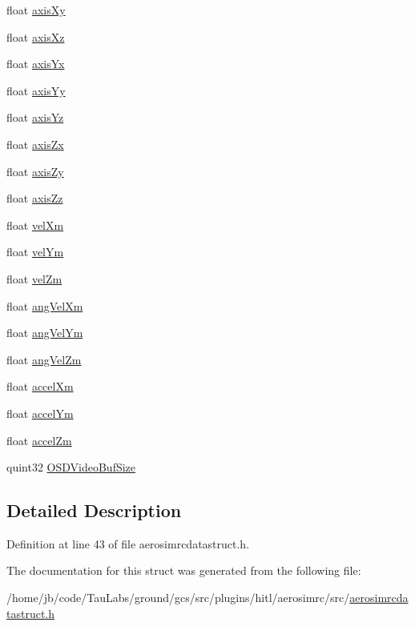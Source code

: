 \begin{DoxyCompactItemize}
\item 
float \hyperlink{group___aero_sim_r_c_gaf149495ae6cb0a4b55f124b645e0cc8d}{axis\-Xy}
\item 
float \hyperlink{group___aero_sim_r_c_gaf6a11ab25129a46c7195678d223f8cba}{axis\-Xz}
\item 
float \hyperlink{group___aero_sim_r_c_gab46b6cb491df61bb0808c6a2942f5f26}{axis\-Yx}
\item 
float \hyperlink{group___aero_sim_r_c_gab1c3f18d56d396a6dd95411539ffc0e8}{axis\-Yy}
\item 
float \hyperlink{group___aero_sim_r_c_ga7c0f6efcd45a801369e92067bc85a5ca}{axis\-Yz}
\item 
float \hyperlink{group___aero_sim_r_c_gac74b099d24d55ff1692b855313489324}{axis\-Zx}
\item 
float \hyperlink{group___aero_sim_r_c_ga28db280f796bbada439e147a61037c0f}{axis\-Zy}
\item 
float \hyperlink{group___aero_sim_r_c_ga62dda20d79d63155064a31a27d06e930}{axis\-Zz}
\item 
float \hyperlink{group___aero_sim_r_c_ga5b8ca52e6b6fcba33660c4164ff14b21}{vel\-Xm}
\item 
float \hyperlink{group___aero_sim_r_c_ga78ba6a4d5b2134bed1c2396ff9212df0}{vel\-Ym}
\item 
float \hyperlink{group___aero_sim_r_c_ga35865106b3179109ebbec06aed189fad}{vel\-Zm}
\item 
float \hyperlink{group___aero_sim_r_c_gac5161f5332b6bc49ca097e2c27be8a22}{ang\-Vel\-Xm}
\item 
float \hyperlink{group___aero_sim_r_c_ga1cdf55eb78da8c312e32d9d5be75afef}{ang\-Vel\-Ym}
\item 
float \hyperlink{group___aero_sim_r_c_ga4387cb264fd400cd98815e6145b8114c}{ang\-Vel\-Zm}
\item 
float \hyperlink{group___aero_sim_r_c_ga8e87f9c4846725309216b66cf48a4fdd}{accel\-Xm}
\item 
float \hyperlink{group___aero_sim_r_c_gafb442cc82353fedd9b1a4b1f841a780a}{accel\-Ym}
\item 
float \hyperlink{group___aero_sim_r_c_ga15b5242cd24b1253d8fa5a12d07e3b76}{accel\-Zm}
\item 
quint32 \hyperlink{group___aero_sim_r_c_ga9c59c8c051c445f8f8b17ed8b42a2820}{\-O\-S\-D\-Video\-Buf\-Size}
\end{DoxyCompactItemize}


\subsection{\-Detailed \-Description}


\-Definition at line 43 of file aerosimrcdatastruct.\-h.



\-The documentation for this struct was generated from the following file\-:\begin{DoxyCompactItemize}
\item 
/home/jb/code/\-Tau\-Labs/ground/gcs/src/plugins/hitl/aerosimrc/src/\hyperlink{aerosimrcdatastruct_8h}{aerosimrcdatastruct.\-h}\end{DoxyCompactItemize}
